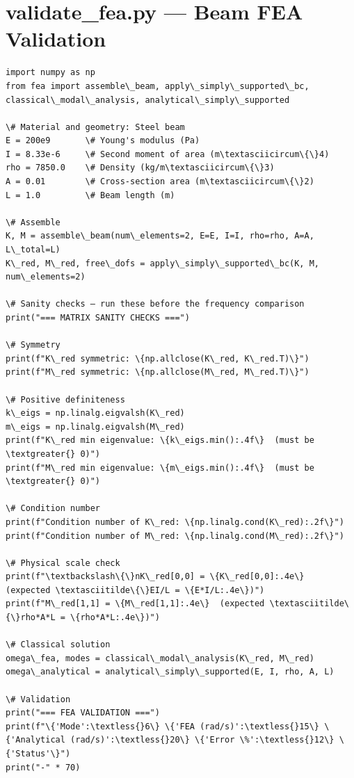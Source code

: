 \documentclass[12pt, a4paper]{article}
\begin{document}
\section{validate_fea.py --- Beam FEA Validation}
\begin{lstlisting}[style=codestyle, caption={{validate_fea.py --- Beam FEA Validation}}]
import numpy as np
from fea import assemble\_beam, apply\_simply\_supported\_bc, classical\_modal\_analysis, analytical\_simply\_supported

\# Material and geometry: Steel beam
E = 200e9       \# Young's modulus (Pa)
I = 8.33e-6     \# Second moment of area (m\textasciicircum\{\}4)
rho = 7850.0    \# Density (kg/m\textasciicircum\{\}3)
A = 0.01        \# Cross-section area (m\textasciicircum\{\}2)
L = 1.0         \# Beam length (m)

\# Assemble
K, M = assemble\_beam(num\_elements=2, E=E, I=I, rho=rho, A=A, L\_total=L)
K\_red, M\_red, free\_dofs = apply\_simply\_supported\_bc(K, M, num\_elements=2)

\# Sanity checks — run these before the frequency comparison
print("=== MATRIX SANITY CHECKS ===")

\# Symmetry
print(f"K\_red symmetric: \{np.allclose(K\_red, K\_red.T)\}")
print(f"M\_red symmetric: \{np.allclose(M\_red, M\_red.T)\}")

\# Positive definiteness
k\_eigs = np.linalg.eigvalsh(K\_red)
m\_eigs = np.linalg.eigvalsh(M\_red)
print(f"K\_red min eigenvalue: \{k\_eigs.min():.4f\}  (must be \textgreater{} 0)")
print(f"M\_red min eigenvalue: \{m\_eigs.min():.4f\}  (must be \textgreater{} 0)")

\# Condition number
print(f"Condition number of K\_red: \{np.linalg.cond(K\_red):.2f\}")
print(f"Condition number of M\_red: \{np.linalg.cond(M\_red):.2f\}")

\# Physical scale check
print(f"\textbackslash\{\}nK\_red[0,0] = \{K\_red[0,0]:.4e\}  (expected \textasciitilde\{\}EI/L = \{E*I/L:.4e\})")
print(f"M\_red[1,1] = \{M\_red[1,1]:.4e\}  (expected \textasciitilde\{\}rho*A*L = \{rho*A*L:.4e\})")

\# Classical solution
omega\_fea, modes = classical\_modal\_analysis(K\_red, M\_red)
omega\_analytical = analytical\_simply\_supported(E, I, rho, A, L)

\# Validation
print("=== FEA VALIDATION ===")
print(f"\{'Mode':\textless{}6\} \{'FEA (rad/s)':\textless{}15\} \{'Analytical (rad/s)':\textless{}20\} \{'Error \%':\textless{}12\} \{'Status'\}")
print("-" * 70)


\end{lstlisting}
\end{document}
